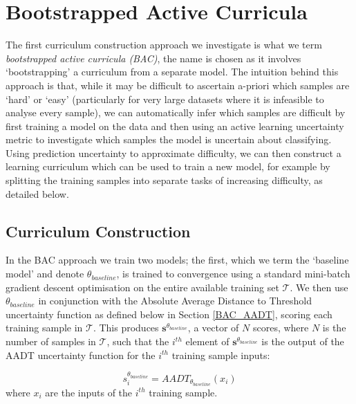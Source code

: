 \chapter{Bootstrapped Active Curricula}\label{ch:BootstrappedActiveCurricula}
The first curriculum construction approach we investigate is what we term \textit{bootstrapped active curricula (BAC)}, the name is chosen as it involves `bootstrapping' a curriculum from a separate model. The intuition behind this approach is that, while it may be difficult to ascertain a-priori which samples are `hard' or `easy' (particularly for very large datasets where it is infeasible to analyse every sample), we can automatically infer which samples are difficult by first training a model on the data and then using an active learning uncertainty metric to investigate which samples the model is uncertain about classifying. Using prediction uncertainty to approximate difficulty, we can then construct a learning curriculum which can be used to train a new model, for example by splitting the training samples into separate tasks of increasing difficulty, as detailed below.
\section{Curriculum Construction}
In the BAC approach we train two models; the first, which we term the `baseline model' and denote  $\theta_{baseline}$, is trained to convergence using a standard mini-batch gradient descent optimisation on the entire available training set $\mathcal{T}$. We then use $\theta_{baseline}$ in conjunction with the Absolute Average Distance to Threshold uncertainty function as defined below in Section \ref{BAC_AADT}, scoring each training sample in $\mathcal{T}$. This produces $\mathbf{s}^{\theta_{baseline}}$, a vector of $N$ scores, where $N$ is the number of samples in $\mathcal{T}$, such that the $i^{th}$ element of $\mathbf{s}^{\theta_{baseline}}$ is the output of the AADT uncertainty function for the $i^{th}$ training sample inputs:

\begin{equation}\label{eq:BAC_S}
s^{\theta_{baseline}}_i = AADT_{\theta_{baseline}}(x_i) 
\end{equation}
where $x_i$ are the inputs of the $i^{th}$ training sample. 

